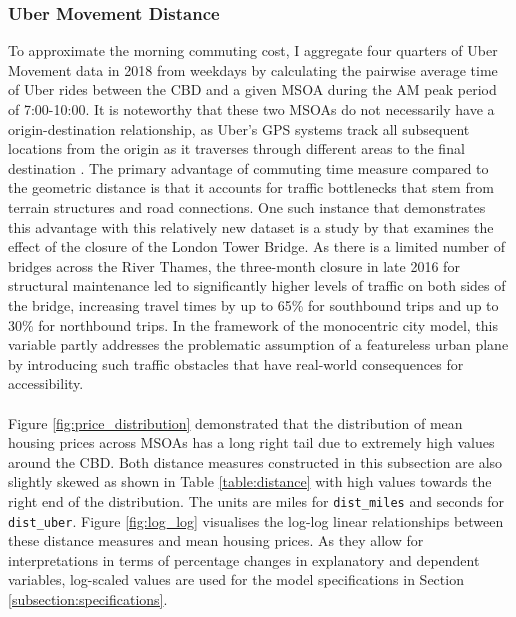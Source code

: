 \documentclass{article}
\begin{document}
\subsubsection{Uber Movement Distance}
To approximate the morning commuting cost, I aggregate four quarters of Uber Movement data \citep{UberMovement2019MovementCities} in 2018 from weekdays by calculating the pairwise average time of Uber rides between the CBD and a given MSOA during the AM peak period of 7:00-10:00. It is noteworthy that these two MSOAs do not necessarily have a origin-destination relationship, as Uber's GPS systems track all subsequent locations from the origin as it traverses through different areas to the final destination \citep{UberMovementUberMethodology}. The primary advantage of commuting time measure compared to the geometric distance is that it accounts for traffic bottlenecks that stem from terrain structures and road connections. One such instance that demonstrates this advantage with this relatively new dataset is a study by \citet{UberMovementTeam2018ExaminingClosure} that examines the effect of the closure of the London Tower Bridge. As there is a limited number of bridges across the River Thames, the three-month closure in late 2016 for structural maintenance led to significantly higher levels of traffic on both sides of the bridge, increasing travel times by up to 65\% for southbound trips and up to 30\% for northbound trips. In the framework of the monocentric city model, this variable partly addresses the problematic assumption of a featureless urban plane by introducing such traffic obstacles that have real-world consequences for accessibility.\\\\
Figure \ref{fig:price_distribution} demonstrated that the distribution of mean housing prices across MSOAs has a long right tail due to extremely high values around the CBD. Both distance measures constructed in this subsection are also slightly skewed as shown in Table \ref{table:distance} with high values towards the right end of the distribution. The units are miles for \texttt{dist\_miles} and seconds for \texttt{dist\_uber}. Figure \ref{fig:log_log} visualises the log-log linear relationships between these distance measures and mean housing prices. As they allow for interpretations in terms of percentage changes in explanatory and dependent variables, log-scaled values are used for the model specifications in Section \ref{subsection:specifications}.
\end{document}
